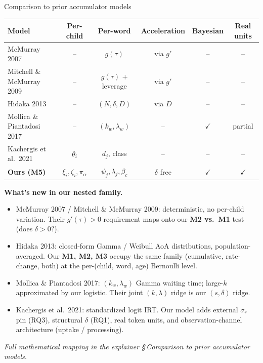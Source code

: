 \documentclass[aspectratio=169,t]{beamer}
\renewcommand{\arraystretch}{1.05}
\newcommand{\pia}{\pi_{\alpha}}
\begin{document}
\begin{frame}{Comparison to prior accumulator models}

\centering
\scriptsize
\renewcommand{\arraystretch}{1.15}
\begin{tabular}{@{}lccccc@{}}
\toprule
Model & Per-child & Per-word & Acceleration & Bayesian & Real units \\
\midrule
McMurray 2007                 & --                          & $g(\tau)$               & via $g'$                & --              & --     \\
Mitchell \& McMurray 2009     & --                          & $g(\tau)$ + leverage    & via $g'$                & --              & --     \\
Hidaka 2013                   & --                          & $(N, \delta, D)$        & via $D$                 & --              & --     \\
Mollica \& Piantadosi 2017    & --                          & $(k_w, \lambda_w)$      & --                      & $\checkmark$    & partial \\
Kachergis et al.\ 2021        & $\theta_i$                  & $d_j$, class            & --                      & --              & --     \\
\textbf{Ours (M5)}            & $\xi_i, \zeta_i, \pia$      & $\psi_j, \lambda_j, \beta_c$ & $\delta$ free        & $\checkmark$    & $\checkmark$ \\
\bottomrule
\end{tabular}

\vspace{1.2em}
\footnotesize
\textbf{What's new in our nested family.}
\begin{itemize}\setlength\itemsep{0.15em}
\item McMurray 2007 / Mitchell \& McMurray 2009: deterministic, no per-child variation.  Their $g'(\tau) > 0$ requirement maps onto our \textbf{M2 vs.\ M1} test (does $\delta > 0$?).
\item Hidaka 2013: closed-form Gamma / Weibull AoA distributions, population-averaged. Our \textbf{M1, M2, M3} occupy the same family (cumulative, rate-change, both) at the per-(child, word, age) Bernoulli level.
\item Mollica \& Piantadosi 2017: $(k_w, \lambda_w)$ Gamma waiting time; large-$k$ approximated by our logistic. Their joint $(k, \lambda)$ ridge is our $(s, \delta)$ ridge.
\item Kachergis et al.\ 2021: standardized logit IRT.  Our model adds external $\sigma_r$ pin (RQ3), structural $\delta$ (RQ1), real token units, and observation-channel architecture (uptake / processing).
\end{itemize}

\flushleft
\scriptsize\textit{Full mathematical mapping in the explainer §\,Comparison to prior accumulator models.}

\end{frame}
\end{document}
